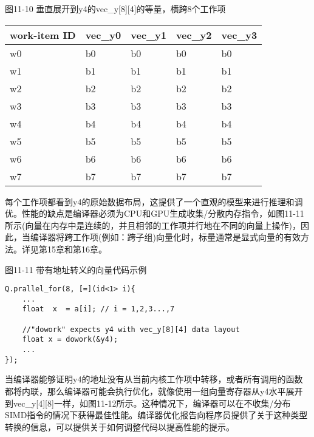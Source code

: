 \hspace*{\fill} \par %
图11-10 垂直展开到y4的vec\_y[8][4]的等量，横跨8个工作项
\begin{table}[]
	\begin{tabular}{|l|l|l|l|l|}
		\hline
		work-item ID & vec\_y0 & vec\_y1 & vec\_y2 & vec\_y3 \\ \hline
		w0           & b0      & b0      & b0      & b0      \\ \hline
		w1           & b1      & b1      & b1      & b1      \\ \hline
		w2           & b2      & b2      & b2      & b2      \\ \hline
		w3           & b3      & b3      & b3      & b3      \\ \hline
		w4           & b4      & b4      & b4      & b4      \\ \hline
		w5           & b5      & b5      & b5      & b5      \\ \hline
		w6           & b6      & b6      & b6      & b6      \\ \hline
		w7           & b7      & b7      & b7      & b7      \\ \hline
	\end{tabular}
\end{table}

每个工作项都看到y4的原始数据布局，这提供了一个直观的模型来进行推理和调优。性能的缺点是编译器必须为CPU和GPU生成收集/分散内存指令，如图11-11所示(向量在内存中是连续的，并且相邻的工作项并行地在不同的向量上操作)，因此，当编译器将跨工作项(例如：跨子组)向量化时，标量通常是显式向量的有效方法。详见第15章和第16章。\par

\hspace*{\fill} \par %
图11-11 带有地址转义的向量代码示例
\begin{lstlisting}[caption={}]
Q.prallel_for(8, [=](id<1> i){
	...
	float  x  = a[i]; // i = 1,2,3...,7

	//"dowork" expects y4 with vec_y[8][4] data layout
	float x = dowork(&y4);
	...
});
\end{lstlisting}

当编译器能够证明y4的地址没有从当前内核工作项中转移，或者所有调用的函数都将内联，那么编译器可能会执行优化，就像使用一组向量寄存器从y4水平展开到vec\_y[4][8]一样，如图11-12所示。这种情况下，编译器可以在不收集/分布SIMD指令的情况下获得最佳性能。编译器优化报告向程序员提供了关于这种类型转换的信息，可以提供关于如何调整代码以提高性能的提示。\par

